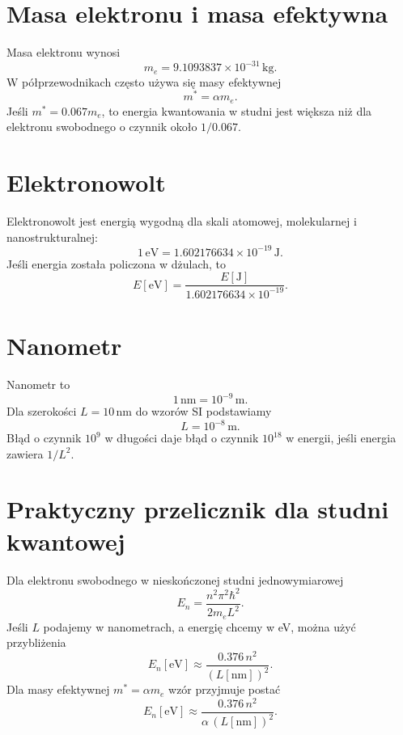\section{Masa elektronu i masa efektywna}

Masa elektronu wynosi
\begin{equation}
    m_e=9.1093837\times10^{-31}\,\mathrm{kg}.
\end{equation}
W półprzewodnikach często używa się masy efektywnej
\begin{equation}
    m^*=\alpha m_e.
\end{equation}
Jeśli \(m^*=0.067m_e\), to energia kwantowania w studni jest większa niż dla
elektronu swobodnego o czynnik około \(1/0.067\).

\section{Elektronowolt}

Elektronowolt jest energią wygodną dla skali atomowej, molekularnej i
nanostrukturalnej:
\begin{equation}
    1\,\mathrm{eV}=1.602176634\times10^{-19}\,\mathrm{J}.
\end{equation}
Jeśli energia została policzona w dżulach, to
\begin{equation}
    E[\mathrm{eV}]=\frac{E[\mathrm{J}]}{1.602176634\times10^{-19}}.
\end{equation}

\section{Nanometr}

Nanometr to
\begin{equation}
    1\,\mathrm{nm}=10^{-9}\,\mathrm{m}.
\end{equation}
Dla szerokości \(L=10\,\mathrm{nm}\) do wzorów SI podstawiamy
\begin{equation}
    L=10^{-8}\,\mathrm{m}.
\end{equation}
Błąd o czynnik \(10^9\) w długości daje błąd o czynnik \(10^{18}\) w energii,
jeśli energia zawiera \(1/L^2\).

\section{Praktyczny przelicznik dla studni kwantowej}

Dla elektronu swobodnego w nieskończonej studni jednowymiarowej
\begin{equation}
    E_n=\frac{n^2\pi^2\hbar^2}{2m_eL^2}.
\end{equation}
Jeśli \(L\) podajemy w nanometrach, a energię chcemy w eV, można użyć
przybliżenia
\begin{equation}
    E_n[\mathrm{eV}]\approx\frac{0.376\,n^2}{(L[\mathrm{nm}])^2}.
\end{equation}
Dla masy efektywnej \(m^*=\alpha m_e\) wzór przyjmuje postać
\begin{equation}
    E_n[\mathrm{eV}]\approx\frac{0.376\,n^2}{\alpha\,(L[\mathrm{nm}])^2}.
\end{equation}

